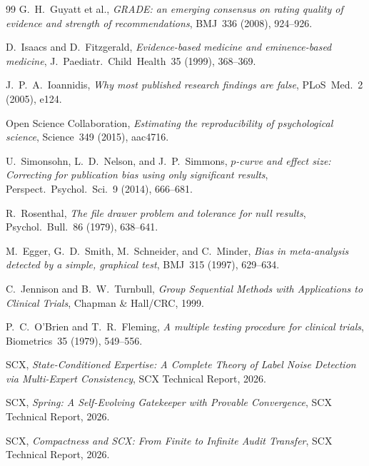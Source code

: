 \documentclass[12pt,a4paper]{article}
\theoremstyle{remark}
\begin{document}
\begin{thebibliography}{99}
G.~H.~Guyatt et al.,
\emph{GRADE: an emerging consensus on rating quality of evidence and
strength of recommendations},
BMJ~336 (2008), 924--926.

D.~Isaacs and D.~Fitzgerald,
\emph{Evidence-based medicine and eminence-based medicine},
J.~Paediatr.~Child~Health~35 (1999), 368--369.

J.~P.~A.~Ioannidis,
\emph{Why most published research findings are false},
PLoS~Med.~2 (2005), e124.

Open Science Collaboration,
\emph{Estimating the reproducibility of psychological science},
Science~349 (2015), aac4716.

U.~Simonsohn, L.~D.~Nelson, and J.~P.~Simmons,
\emph{$p$-curve and effect size: Correcting for publication bias using
only significant results},
Perspect.~Psychol.~Sci.~9 (2014), 666--681.

R.~Rosenthal,
\emph{The file drawer problem and tolerance for null results},
Psychol.~Bull.~86 (1979), 638--641.

M.~Egger, G.~D.~Smith, M.~Schneider, and C.~Minder,
\emph{Bias in meta-analysis detected by a simple, graphical test},
BMJ~315 (1997), 629--634.

C.~Jennison and B.~W.~Turnbull,
\emph{Group Sequential Methods with Applications to Clinical Trials},
Chapman \& Hall/CRC, 1999.

P.~C.~O'Brien and T.~R.~Fleming,
\emph{A multiple testing procedure for clinical trials},
Biometrics~35 (1979), 549--556.

SCX,
\emph{State-Conditioned Expertise: A Complete Theory of Label Noise
Detection via Multi-Expert Consistency},
SCX Technical Report, 2026.

SCX,
\emph{Spring: A Self-Evolving Gatekeeper with Provable Convergence},
SCX Technical Report, 2026.

SCX,
\emph{Compactness and SCX: From Finite to Infinite Audit Transfer},
SCX Technical Report, 2026.

\end{thebibliography}
\end{document}
